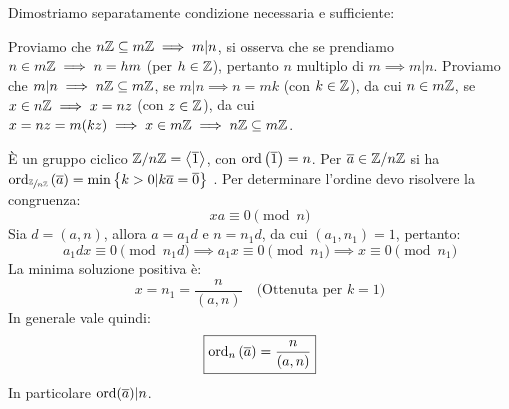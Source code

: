 \documentclass[11pt]{scrartcl}
\begin{document}
\begin{soln}
Dimostriamo separatamente condizione necessaria e sufficiente:
\begin{itemize}
	\ii Proviamo che $n\mathbb Z \subseteq m\mathbb Z \implies m|n$, si osserva che se prendiamo $n \in m\mathbb Z \implies n=hm$ (per $h \in \mathbb Z$), pertanto $n$ multiplo di $m \implies m|n$.
	\ii Proviamo che $m|n \implies n\mathbb Z \subseteq m\mathbb Z$, se $m|n \implies n=mk$ (con $k \in \mathbb Z$), da cui $n \in m\mathbb Z$, se $x \in n\mathbb Z \implies x=nz$ (con $z \in \mathbb Z$), da cui $x=nz=m(kz) \implies x \in m\mathbb Z \implies n\mathbb Z \subseteq m\mathbb Z$.
\end{itemize}
\end{soln}

\begin{remark}
[Il Gruppo $\Zn$]
\label{g:OrdiniZn}
È un gruppo ciclico ${\mathbb Z}/n{\mathbb Z}=\left<\overline{1}\right>$, con $\operatorname{ord}\left(\overline{1}\right)=n$. Per $\overline{a} \in {\mathbb Z}/n{\mathbb Z}$ si ha $\operatorname{ord}_{\sfrac{\mathbb Z}{n\mathbb Z}}\left(\overline{a}\right)=\min\left\{k>0 | k\overline{a}=\overline{0}\right\}$ . Per determinare l'ordine devo risolvere la congruenza:
	\[ xa \equiv 0 \pmod{n}
	\]
Sia $d=(a, n)$, allora $a=a_1d$ e $n=n_1d$, da cui $(a_1, n_1)=1$, pertanto:
	\[ a_1dx \equiv 0 \pmod{n_1d}
	\implies
	a_1x \equiv 0 \pmod{n_1}
	\implies
	x \equiv 0 \pmod{n_1}
	\]
La minima soluzione positiva è:
	\[ x=n_1=\frac{n}{(a, n)} 
	\quad 
	\text{(Ottenuta per $k=1$)}
	\]
In generale vale quindi:
	\[ \boxed{\operatorname{ord}_{n}\left(\overline{a}\right)=\frac{n}{(a,n)}}
	\]
In particolare $\operatorname{ord}(\overline{a})|n$.
\end{remark}
\end{document}
